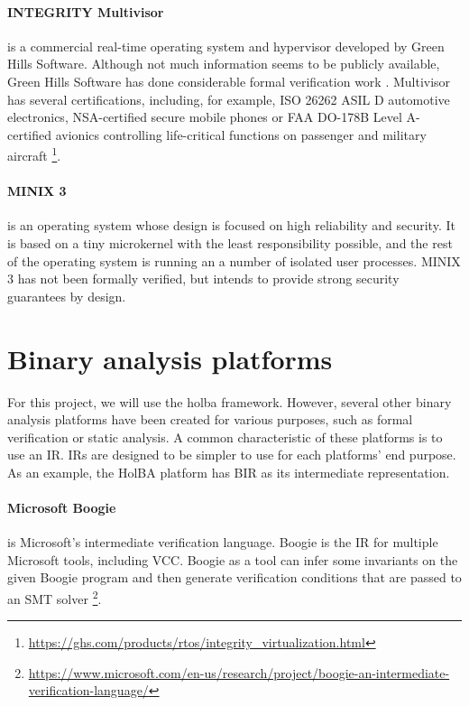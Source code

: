 \documentclass{kththesis}
\begin{document}

\paragraph{INTEGRITY Multivisor} is a commercial real-time operating system and hypervisor developed by Green Hills Software. Although not much information seems to be publicly available, Green Hills Software has done considerable formal verification work \cite{richards_modeling_2010}. Multivisor has several certifications, including, for example, ISO 26262 ASIL D automotive electronics, NSA-certified secure mobile phones or FAA DO-178B Level A-certified avionics controlling life-critical functions on passenger and military aircraft \footnote{\url{https://ghs.com/products/rtos/integrity_virtualization.html}}.

\paragraph{MINIX 3} is an operating system whose design is focused on high reliability and security. It is based on a tiny microkernel with the least responsibility possible, and the rest of the operating system is running an a number of isolated user processes. MINIX 3 has not been formally verified, but intends to provide strong security guarantees by design.

\section{Binary analysis platforms}

For this project, we will use the \gls{holba} framework. However, several other binary analysis platforms have been created for various purposes, such as formal verification or static analysis. A common characteristic of these platforms is to use an \gls{IR}. IRs are designed to be simpler to use for each platforms' end purpose. As an example, the HolBA platform has BIR as its intermediate representation.

\paragraph{Microsoft Boogie} is Microsoft's intermediate verification language. Boogie is the IR for multiple Microsoft tools, including VCC. Boogie as a tool can infer some invariants on the given Boogie program and then generate verification conditions that are passed to an SMT solver \footnote{\url{https://www.microsoft.com/en-us/research/project/boogie-an-intermediate-verification-language/}}.
\end{document}
